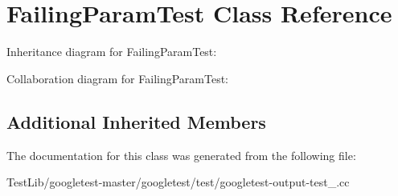 \hypertarget{classFailingParamTest}{}\section{Failing\+Param\+Test Class Reference}
\label{classFailingParamTest}


Inheritance diagram for Failing\+Param\+Test\+:


Collaboration diagram for Failing\+Param\+Test\+:
\subsection*{Additional Inherited Members}


The documentation for this class was generated from the following file\+:\begin{DoxyCompactItemize}
\item 
Test\+Lib/googletest-\/master/googletest/test/googletest-\/output-\/test\+\_\+.\+cc\end{DoxyCompactItemize}
